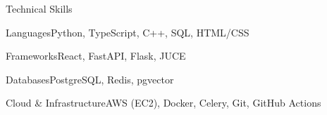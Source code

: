 \documentclass[
	11pt
]{../../../template}
\begin{document}
	\begin{rSection}{T}{echnical Skills}
		\begin{rSet}{Languages}{Python, TypeScript, C++, SQL, HTML/CSS}
		\end{rSet}
		\begin{rSet}{Frameworks}{React, FastAPI, Flask, JUCE}
		\end{rSet}
		\begin{rSet}{Databases}{PostgreSQL, Redis, pgvector}
		\end{rSet}
		\begin{rSet}{Cloud \& Infrastructure}{AWS (EC2), Docker, Celery, Git, GitHub Actions}
		\end{rSet}
	\end{rSection}
\end{document}
